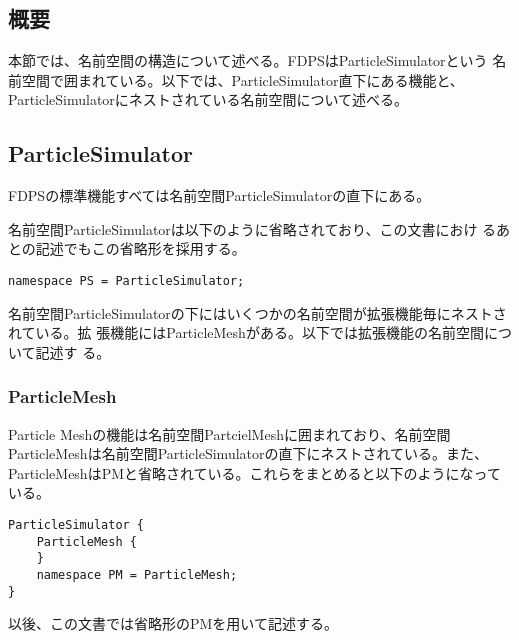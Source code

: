 \subsection{概要}

本節では、名前空間の構造について述べる。FDPSはParticleSimulatorという
名前空間で囲まれている。以下では、ParticleSimulator直下にある機能と、
ParticleSimulatorにネストされている名前空間について述べる。

\subsection{ParticleSimulator}

FDPSの標準機能すべては名前空間ParticleSimulatorの直下にある。

名前空間ParticleSimulatorは以下のように省略されており、この文書におけ
るあとの記述でもこの省略形を採用する。
\begin{screen}
\begin{verbatim}
namespace PS = ParticleSimulator;
\end{verbatim}
\end{screen}

名前空間ParticleSimulatorの下にはいくつかの名前空間が拡張機能毎にネストされている。拡
張機能にはParticleMeshがある。以下では拡張機能の名前空間について記述す
る。

\subsubsection{ParticleMesh}

Particle Meshの機能は名前空間PartcielMeshに囲まれており、名前空間
ParticleMeshは名前空間ParticleSimulatorの直下にネストされている。また、
ParticleMeshはPMと省略されている。これらをまとめると以下のようになって
いる。
\begin{screen}
\begin{verbatim}
ParticleSimulator {
    ParticleMesh {
    }
    namespace PM = ParticleMesh;
}
\end{verbatim}
\end{screen}

以後、この文書では省略形のPMを用いて記述する。
